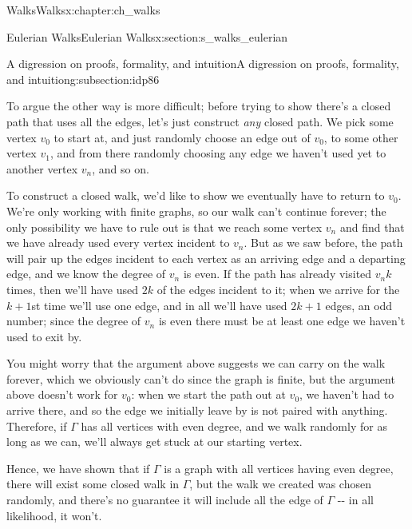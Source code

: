 \documentclass[oneside,10pt,]{book}
\numberwithin{equation}{section}
\begin{document}
\begin{chapterptx}{Walks}{}{Walks}{}{}{x:chapter:ch_walks}
\begin{sectionptx}{Eulerian Walks}{}{Eulerian Walks}{}{}{x:section:s_walks_eulerian}
\begin{subsectionptx}{A digression on proofs, formality, and intuition}{}{A digression on proofs, formality, and intuition}{}{}{g:subsection:idp86}
\par
To argue the other way is more difficult; before trying to show there's a closed path that uses all the edges, let's just construct \emph{any} closed path.  We pick some vertex \(v_0\) to start at, and just randomly choose an edge out of \(v_0\), to some other vertex \(v_1\), and from there randomly choosing any edge we haven't used yet to another vertex \(v_n\), and so on.%
\par
To construct a closed walk, we'd like to show we eventually have to return to \(v_0\).  We're only working with finite graphs, so our walk can't continue forever; the only possibility we have to rule out is that we reach some vertex \(v_n\) and find that we have already used every vertex incident to \(v_n\).  But as we saw before, the path will pair up the edges incident to each vertex as an arriving edge and a departing edge, and we know the degree of \(v_n\) is even.  If the path has already visited \(v_n k\) times, then we'll have used \(2k\) of the edges incident to it; when we arrive for the \(k+1\)st time we'll use one edge, and in all we'll have used \(2k+1\) edges, an odd number; since the degree of \(v_n\) is even there must be at least one edge we haven't used to exit by.%
\par
You might worry that the argument above suggests we can carry on the walk forever, which we obviously can't do since the graph is finite, but the argument above doesn't work for \(v_0\): when we start the path out at \(v_0\), we haven't had to arrive there, and so the edge we initially leave by is not paired with anything.  Therefore, if \(\Gamma\) has all vertices with even degree, and we walk randomly for as long as we can, we'll always get stuck at our starting vertex.%
\par
Hence, we have shown that if \(\Gamma\) is a graph with all vertices having even degree, there will exist some closed walk in \(\Gamma\), but the walk we created was chosen randomly, and there's no guarantee it will include all the edge of \(\Gamma\) -{}-{} in all likelihood, it won't.%
\par

\end{subsectionptx}
\end{sectionptx}
\end{chapterptx}
\end{document}
